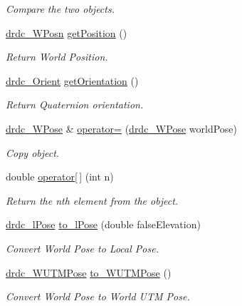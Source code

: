 \begin{CompactItemize}
\begin{CompactList}\small\item\em Compare the two objects. \item\end{CompactList}\item 
\hyperlink{classdrdc__WPosn}{drdc\_\-WPosn} \hyperlink{classdrdc__WPose_5467f7210d14c9622e938bb0ffbfdb34}{getPosition} ()
\begin{CompactList}\small\item\em Return World Position. \item\end{CompactList}\item 
\hyperlink{classdrdc__Orient}{drdc\_\-Orient} \hyperlink{classdrdc__WPose_fe1c71a99f8d8408985ea2659976a872}{getOrientation} ()
\begin{CompactList}\small\item\em Return Quaternion orientation. \item\end{CompactList}\item 
\hyperlink{classdrdc__WPose}{drdc\_\-WPose} \& \hyperlink{classdrdc__WPose_c5657fdb3b91aa2319a39f07b6c966b9}{operator=} (\hyperlink{classdrdc__WPose}{drdc\_\-WPose} worldPose)
\begin{CompactList}\small\item\em Copy object. \item\end{CompactList}\item 
double \hyperlink{classdrdc__WPose_d6be16cfcf5278de7b802e8c83832ebd}{operator\mbox{[}$\,$\mbox{]}} (int n)
\begin{CompactList}\small\item\em Return the nth element from the object. \item\end{CompactList}\item 
\hyperlink{classdrdc__lPose}{drdc\_\-lPose} \hyperlink{classdrdc__WPose_9408d7f14b5a4a01843b2264a52b1e9c}{to\_\-lPose} (double falseElevation)
\begin{CompactList}\small\item\em Convert World Pose to Local Pose. \item\end{CompactList}\item 
\hyperlink{classdrdc__WUTMPose}{drdc\_\-WUTMPose} \hyperlink{classdrdc__WPose_e66211f37411b436ae76c10939144fcc}{to\_\-WUTMPose} ()
\begin{CompactList}\small\item\em Convert World Pose to World UTM Pose. \item\end{CompactList}\end{CompactItemize}
